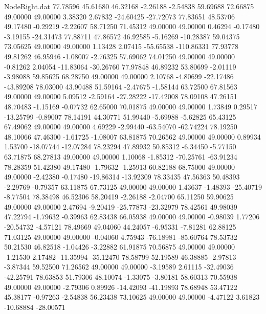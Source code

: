 \begin{filecontents}{NodeRight.dat}
  77.78596   45.61680   46.32168    -2.26188   -2.54838   59.69688   72.66875   49.00000   49.00000    3.38320    2.67832  -24.60425  -27.72073
  77.83651   48.53706   49.17480    -0.29219   -2.22607   58.71250   71.45312   49.00000   49.00000    0.46294   -0.17480   -3.19155  -24.31473
  77.88711   47.86572   46.92585    -5.16269  -10.28387   59.04375   73.05625   49.00000   49.00000    1.13428    2.07415  -55.65538 -110.86331
  77.93778   49.81262   46.95946    -1.08007   -2.76325   57.69062   74.01250   49.00000   49.00000   -0.81262    2.04054  -11.83064  -30.26760
  77.97848   46.89232   53.80699    -2.01119   -3.98088   59.85625   68.28750   49.00000   49.00000    2.10768   -4.80699  -22.17486  -43.89208
  78.03000   43.90488   51.59164    -2.47675   -1.58144   63.72500   67.81563   49.00000   49.00000    5.09512   -2.59164  -27.28222  -17.42008
  78.09108   47.26151   48.70483    -1.15169   -0.07732   62.65000   70.01875   49.00000   49.00000    1.73849    0.29517  -13.25799   -0.89007
  78.14191   44.30771   51.99440    -5.69988   -5.62825   65.43125   67.49062   49.00000   49.00000    4.69229   -2.99440  -63.54070  -62.74224
  78.19250   48.10066   47.46300    -1.61725   -1.08007   63.81875   70.26562   49.00000   49.00000    0.89934    1.53700  -18.07744  -12.07284
  78.23294   47.89932   50.85312    -6.34450   -5.77150   63.71875   68.27813   49.00000   49.00000    1.10068   -1.85312  -70.25761  -63.91234
  78.28359   51.42380   49.17480    -1.79632   -1.25913   60.82188   68.75000   49.00000   49.00000   -2.42380   -0.17480  -19.86314  -13.92309
  78.33435   47.56363   50.48393    -2.29769   -0.79357   63.11875   67.73125   49.00000   49.00000    1.43637   -1.48393  -25.40719   -8.77504
  78.38498   46.52306   58.20419    -2.26188   -2.04700   65.11250   59.90625   49.00000   49.00000    2.47694   -9.20419  -25.77873  -23.32979
  78.42561   49.98039   47.22794    -1.79632   -0.39963   62.83438   66.05938   49.00000   49.00000   -0.98039    1.77206  -20.54732   -4.57121
  78.49669   49.04060   44.24057    -6.95331   -7.81281   62.88125   71.03125   49.00000   49.00000   -0.04060    4.75943  -76.18981  -85.60764
  78.53732   50.21530   46.82518    -1.04426   -3.22882   61.91875   70.56875   49.00000   49.00000   -1.21530    2.17482  -11.35994  -35.12470
  78.58799   52.19589   46.38885    -2.97813   -3.87344   59.52500   71.26562   49.00000   49.00000   -3.19589    2.61115  -32.49036  -42.25791
  78.63853   51.79306   48.10074    -1.33075   -3.80181   58.60313   70.55938   49.00000   49.00000   -2.79306    0.89926  -14.42093  -41.19893
  78.68948   53.47122   45.38177    -0.97263   -2.54838   56.23438   73.10625   49.00000   49.00000   -4.47122    3.61823  -10.68884  -28.00571

\end{filecontents}
